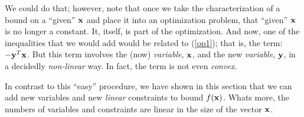 \documentclass[12pt]{article}
\begin{document}
We could do that; however, note that once we take the characterization of a bound on a ``given'' ${\bf x}$ 
and place it into an optimization problem, that ``given'' ${\bf x}$ is no longer a constant.
It, itself, is part of the optimization. And now, one of the inequalities that we would add
would be related to (\ref{op1}); that is, the term: $-{\bf y}^T {\bf x}$. But this term
involves the (now) {\it variable\/}, ${\bf x}$, and the new {\it variable\/}, ${\bf y}$, in a decidedly {\it non-linear\/} way.
In fact, the term is not even {\it convex\/}.

In contrast to this ``easy'' procedure, we have shown in this section that 
we can add new variables and new {\it linear\/} constraints to bound $f({\bf x})$.
Whats more, the numbers of variables and constraints are linear in the size of the vector ${\bf x}$.
\end{document}
